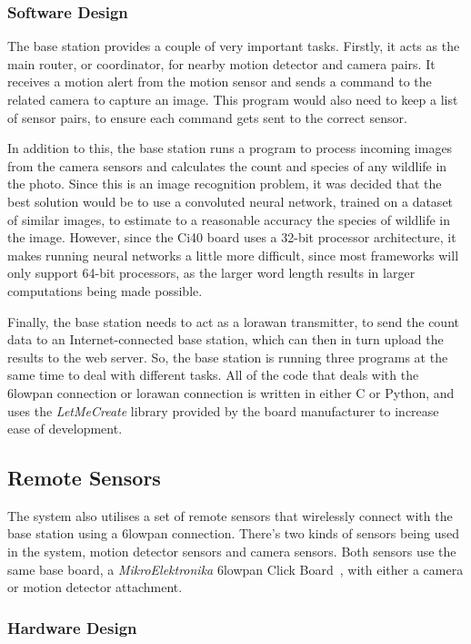 \subsubsection{Software Design}
The base station provides a couple of very important tasks. Firstly, it acts
as the main router, or coordinator, for nearby motion detector and camera
pairs. It receives a motion alert from the motion sensor and sends a command
to the related camera to capture an image. This program would also need to
keep a list of sensor pairs, to ensure each command gets sent to the correct
sensor.

In addition to this, the base station runs a program to process incoming
images from the camera sensors and calculates the count and species of any
wildlife in the photo. Since this is an image recognition problem, it was
decided that the best solution would be to use a convoluted neural network,
trained on a dataset of similar images, to estimate to a reasonable accuracy
the species of wildlife in the image. However, since the Ci40 board uses a
32-bit processor architecture, it makes running neural networks a little more
difficult, since most frameworks will only support 64-bit processors, as the
larger word length results in larger computations being made possible.

Finally, the base station needs to act as a \gls{lorawan} transmitter, to
send the count data to an Internet-connected base station, which can then in
turn upload the results to the web server. So, the base station is running
three programs at the same time to deal with different tasks. All of the code
that deals with the \gls{6lowpan} connection or \gls{lorawan} connection is
written in either C or Python, and uses the \textit{LetMeCreate} library
provided by the board manufacturer to increase ease of development.

\subsection{Remote Sensors}

The system also utilises a set of remote sensors that wirelessly connect with
the base station using a \gls{6lowpan} connection. There's two kinds of
sensors being used in the system, motion detector sensors and camera sensors.
Both sensors use the same base board, a \textit{MikroElektronika}
\gls{6lowpan} Click Board~\cite{mikroeclick}, with either a camera or motion
detector attachment.

\subsubsection{Hardware Design}

